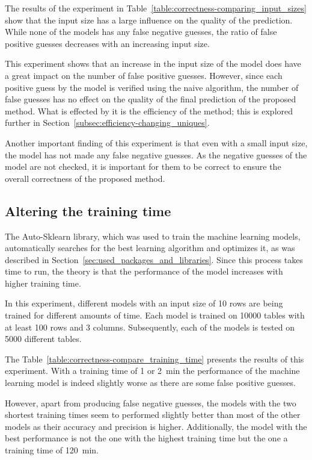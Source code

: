 The results of the experiment in Table~\ref{table:correctness-comparing_input_sizes} show that the input size has a large influence on the quality of the prediction. While none of the models has any false negative guesses, the ratio of false positive guesses decreases with an increasing input size.

This experiment shows that an increase in the input size of the model does have a great impact on the number of false positive guesses. However, since each positive guess by the model is verified using the naive algorithm, the number of false guesses has no effect on the quality of the final prediction of the proposed method. What is effected by it is the efficiency of the method; this is explored further in Section~\ref{subsec:efficiency-changing_uniques}.

Another important finding of this experiment is that even with a small input size, the model has not made any false negative guesses. As the negative guesses of the model are not checked, it is important for them to be correct to ensure the overall correctness of the proposed method.




\subsection{Altering the training time}\label{subsec:correctness_comparing-training-time} %
The Auto-Sklearn library, which was used to train the machine learning models, automatically searches for the best learning algorithm and optimizes it, as was described in Section~\ref{sec:used_packages_and_libraries}. Since this process takes time to run, the theory is that the performance of the model increases with higher training time. %

In this experiment, different models with an input size of \num{10} rows are being trained for different amounts of time. Each model is trained on \num{10000} tables with at least \num{100} rows and \num{3} columns. Subsequently, each of the models is tested on \num{5000} different tables.

The Table~\ref{table:correctness-compare_training_time} presents the results of this experiment. With a training time of \num{1} or \SI{2}{\minute} the performance of the machine learning model is indeed slightly worse as there are some false positive guesses. %

However, apart from producing false negative guesses, the models with the two shortest training times seem to performed slightly better than most of the other models as their accuracy and precision is higher. Additionally, the model with the best performance is not the one with the highest training time but the one a training time of \SI{120}{\minute}.

